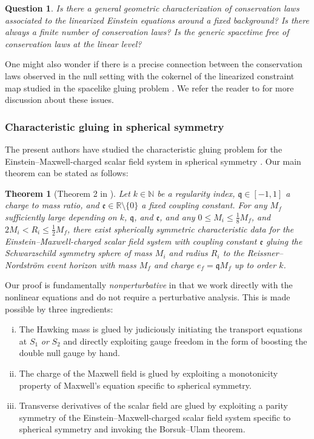 \documentclass[10pt]{article}
\numberwithin{equation}{section}
\theoremstyle{plain}
\newtheorem{thm}{Theorem}%
\newtheorem{question}{Question}
\theoremstyle{definition}
\renewcommand{\Bbb}{\mathbb}
\begin{document}
\begin{question}
    Is there a general geometric characterization of conservation laws associated to the linearized Einstein equations around a fixed background? Is there always a finite number of conservation laws? Is the generic spacetime free of conservation laws at the linear level? 
\end{question}

One might also wonder if there is a precise connection between the conservation laws observed in the null setting with the cokernel of the linearized constraint map studied in the spacelike gluing problem \cite{Corvino, CorvinoSchoen, ChruscielDelay}. We refer the reader to \cite{Gluing-variations} for more discussion about these issues. 

\subsubsection{Characteristic gluing in spherical symmetry}

The present authors have studied the characteristic gluing problem for the Einstein--Maxwell-charged scalar field system in spherical symmetry \cite{KU22}. Our main theorem can be stated as follows:

\begin{thm}[Theorem 2 in \cite{KU22}]
\label{thm-informal-statement}
Let $k\in \Bbb N$ be a regularity index, $\mathfrak q\in [-1,1]$  a charge to mass ratio,  and  $\mathfrak e\in \Bbb R\setminus\{0\}$ a fixed coupling constant. For any $M_f$ sufficiently large depending on $k$, $\mathfrak q$, and $\mathfrak e$, and any $0\le M_i\le \frac 18 M_f$, and $2M_i<R_i\le \tfrac 12 M_f$, 
there exist spherically symmetric characteristic data for the Einstein--Maxwell-charged scalar field system with coupling constant $\mathfrak e$ gluing the Schwarzschild symmetry sphere of mass $M_i$ and radius $R_i$ to the Reissner--Nordstr\"om event horizon with mass $M_f$ and charge $e_f=\mathfrak{q}M_f$ up to order $k$. 
\end{thm}

Our proof is fundamentally \emph{nonperturbative} in that we work directly with the nonlinear equations and do not require a perturbative analysis. This is made possible by three ingredients:
\begin{enumerate}[(i)]
    \item The Hawking mass is glued by judiciously initiating the transport equations at $S_1$ \emph{or} $S_2$ and directly exploiting gauge freedom in the form of boosting the double null gauge by hand.  

    \item The charge of the Maxwell field is glued by exploiting a monotonicity property of Maxwell's equation specific to spherical symmetry.

    \item Transverse derivatives of the scalar field are glued by exploiting a parity symmetry of the Einstein--Maxwell-charged scalar field system specific to spherical symmetry and invoking the Borsuk--Ulam theorem. 
\end{enumerate}
\end{document}
